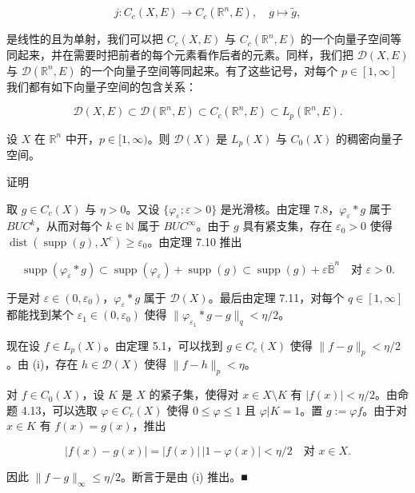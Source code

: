 \[
j : C_{c}(X,E) \to C_{c}(\mathbb{R}^{n},E) , \quad g \mapsto \tilde{g} ,
\]

是线性的且为单射，我们可以把 $ C_{c}(X,E) $ 与 $ C_{c}(\mathbb{R}^{n},E) $ 的一个向量子空间等同起来，并在需要时把前者的每个元素看作后者的元素。同样，我们把 $ \mathcal{D}(X,E) $ 与 $ \mathcal{D}(\mathbb{R}^{n},E) $ 的一个向量子空间等同起来。有了这些记号，对每个 $ p \in [1,\infty] $ 我们都有如下向量子空间的包含关系：

\[
\mathcal{D}(X,E) \subset \mathcal{D}(\mathbb{R}^{n},E) \subset C_{c}(\mathbb{R}^{n},E) \subset L_{p}(\mathbb{R}^{n},E) .
\]

\begin{theorem}

设 $ X $ 在 $ \mathbb{R}^{n} $ 中开，$ p \in [1,\infty) $。则 $ \mathcal{D}(X) $ 是 $ L_{p}(X) $ 与 $ C_{0}(X) $ 的稠密向量子空间。

证明

\begin{subitems}
\item

取 $ g \in C_{c}(X) $ 与 $ \eta > 0 $。又设 $ \{\varphi_{\varepsilon} ; \varepsilon > 0\} $ 是光滑核。由定理 7.8，$ \varphi_{\varepsilon} * g $ 属于 $ BUC^{k} $，从而对每个 $ k \in \mathbb{N} $ 属于 $ BUC^{\infty} $。由于 $ g $ 具有紧支集，存在 $ \varepsilon_{0} > 0 $ 使得 $ \operatorname{dist}(\operatorname{supp}(g),X^{c}) \ge \varepsilon_{0} $。由定理 7.10 推出

\[
\operatorname{supp}(\varphi_{\varepsilon} * g) \subset \operatorname{supp}(\varphi_{\varepsilon}) + \operatorname{supp}(g) \subset \operatorname{supp}(g) + \varepsilon\overline{\mathbb{B}}^{n} \quad \text{对 } \varepsilon > 0 .
\]

于是对 $ \varepsilon \in (0,\varepsilon_{0}) $，$ \varphi_{\varepsilon} * g $ 属于 $ \mathcal{D}(X) $。最后由定理 7.11，对每个 $ q \in [1,\infty] $ 都能找到某个 $ \varepsilon_{1} \in (0,\varepsilon_{0}) $ 使得 $ \|\varphi_{\varepsilon_{1}} * g - g\|_{q} < \eta/2 $。

\item

现在设 $ f \in L_{p}(X) $。由定理 5.1，可以找到 $ g \in C_{c}(X) $ 使得 $ \|f - g\|_{p} < \eta/2 $。由 (i)，存在 $ h \in \mathcal{D}(X) $ 使得 $ \|f - h\|_{p} < \eta $。

\item

对 $ f \in C_{0}(X) $，设 $ K $ 是 $ X $ 的紧子集，使得对 $ x \in X \setminus K $ 有 $ |f(x)| < \eta/2 $。由命题 4.13，可以选取 $ \varphi \in C_{c}(X) $ 使得 $ 0 \le \varphi \le 1 $ 且 $ \varphi|K = 1 $。置 $ g := \varphi f $。由于对 $ x \in K $ 有 $ f(x) = g(x) $，推出

\[
|f(x) - g(x)| = |f(x)|\,|1 - \varphi(x)| < \eta/2 \quad \text{对 } x \in X .
\]

因此 $ \|f - g\|_{\infty} \le \eta/2 $。断言于是由 (i) 推出。\nobreak\hspace{0.35em}■

\end{subitems}

\end{theorem}

